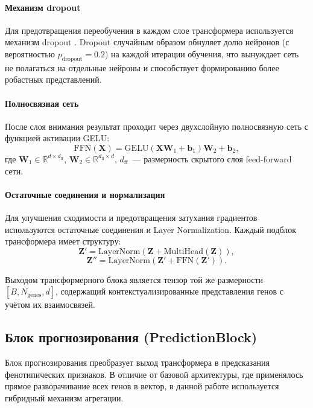 \paragraph{Механизм dropout}

Для предотвращения переобучения в каждом слое трансформера используется 
механизм dropout \cite{Srivastava2014}. Dropout случайным образом 
обнуляет долю нейронов (с вероятностью $p_{\text{dropout}} = 0.2$) на 
каждой итерации обучения, что вынуждает сеть не полагаться на отдельные 
нейроны и способствует формированию более робастных представлений.

\paragraph{Полносвязная сеть}

После слоя внимания результат проходит через двухслойную полносвязную сеть 
с функцией активации GELU:
\[
\text{FFN}(\mathbf{X}) = \text{GELU}(\mathbf{X} \mathbf{W}_1 + \mathbf{b}_1) \mathbf{W}_2 + \mathbf{b}_2,
\]
где $\mathbf{W}_1 \in \mathbb{R}^{d \times d_{\text{ff}}}$, 
$\mathbf{W}_2 \in \mathbb{R}^{d_{\text{ff}} \times d}$, $d_{\text{ff}}$~--- 
размерность скрытого слоя feed-forward сети.

\paragraph{Остаточные соединения и нормализация}

Для улучшения сходимости и предотвращения затухания градиентов используются 
остаточные соединения и Layer Normalization. Каждый подблок трансформера 
имеет структуру:
\[
\mathbf{Z}' = \text{LayerNorm}(\mathbf{Z} + \text{MultiHead}(\mathbf{Z})),
\]
\[
\mathbf{Z}'' = \text{LayerNorm}(\mathbf{Z}' + \text{FFN}(\mathbf{Z}')).
\]

Выходом трансформерного блока является тензор той же размерности 
$[B, N_{\text{genes}}, d]$, содержащий контекстуализированные представления 
генов с учётом их взаимосвязей.

\subsection{Блок прогнозирования (PredictionBlock)}

Блок прогнозирования преобразует выход трансформера в предсказания 
фенотипических признаков. В отличие от базовой архитектуры, где применялось 
прямое разворачивание всех генов в вектор, в данной работе используется 
гибридный механизм агрегации.

